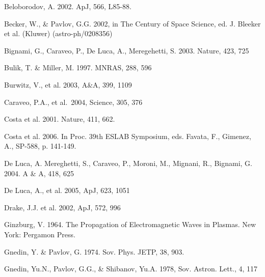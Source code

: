 \documentclass[useAMS,onecolumn,usenatbib,usegraphicx]{mn2e}
\begin{document}
\begin{thebibliography}{}

Beloborodov, A. 2002. ApJ, 566, L85-88.

Becker, W., \& Pavlov, G.G. 2002, in The Century of Space Science,
ed. J. Bleeker et al. (Kluwer) (astro-ph/0208356)

Bignami, G., Caraveo, P., De Luca, A., Meregehetti, S. 2003. Nature, 423, 725

Bulik, T. \& Miller, M. 1997. MNRAS, 288, 596

Burwitz, V., et al. 2003, A\&A, 399, 1109

Caraveo, P.A., et al.~2004, Science, 305, 376

Costa et al. 2001. Nature, 411, 662.

Costa et al.  2006. In Proc. 39th ESLAB Symposium, eds. Favata, F.,
Gimenez, A., SP-588, p. 141-149.

De Luca, A. Mereghetti, S., Caraveo, P., Moroni, M., Mignani, R., Bignami, G. 2004. A \& A, 418, 625

De Luca, A., et al. 2005, ApJ, 623, 1051

Drake, J.J. et al. 2002, ApJ, 572, 996

Ginzburg, V. 1964. The Propagation of Electromagnetic Waves in Plasmas. New York: Pergamon Press.

Gnedin, Y. \& Pavlov, G. 1974. Sov. Phys. JETP, 38, 903.

Gnedin, Yu.N., Pavlov, G.G., \& Shibanov, Yu.A. 1978, Sov. Astron. Lett., 4,
117


\end{thebibliography}
\end{document}
